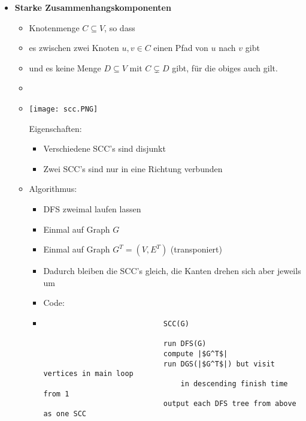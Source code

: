 \begin{itemize}
        \item \textbf{Starke Zusammenhangskomponenten}
            \begin{itemize}
                \item Knotenmenge $C \subseteq V$, so dass
                \item[] es zwischen zwei Knoten $u,v \in C$ einen Pfad von $u$ nach $v$ gibt
                \item[] und es keine Menge $D \subseteq V$ mit $C \subsetneq D$ gibt, für die obiges auch gilt.
                \item[] 
                \item[]
                    \begin{minipage}{0.35\textwidth}
                        \texttt{[image: scc.PNG]}
                    \end{minipage} 
                    \begin{minipage}{0.55\textwidth}
                    Eigenschaften:
                        \begin{itemize}
                            \item Verschiedene SCC's sind disjunkt
                            \item Zwei SCC's sind nur in eine Richtung verbunden
                        \end{itemize}
                    \end{minipage}
                \item Algorithmus:
                    \begin{itemize}
                        \item DFS zweimal laufen lassen
                        \item[] Einmal auf Graph $G$
                        \item[] Einmal auf Graph $G^T = (V,E^T)$ (transponiert)
                        \item Dadurch bleiben die SCC's gleich, die Kanten drehen sich aber jeweils um
                        \item Code:
                        \item[]
                            \begin{verbatim}
                            SCC(G)

                            run DFS(G)
                            compute |$G^T$|
                            run DGS(|$G^T$|) but visit vertices in main loop
                                in descending finish time from 1
                            output each DFS tree from above as one SCC
                            \end{verbatim}
                    \end{itemize}
            \end{itemize}
    \end{itemize}

